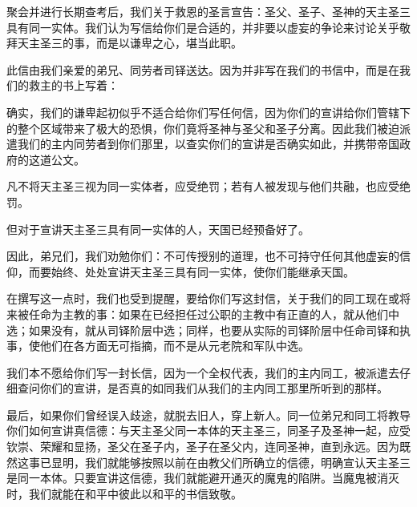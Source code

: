 聚会并进行长期查考后，我们关于救恩的圣言宣告：圣父、圣子、圣神的天主圣三具有同一实体。我们认为写信给你们是合适的，并非要以虚妄的争论来讨论关乎敬拜天主圣三的事，而是以谦卑之心，堪当此职。\par

此信由我们亲爱的弟兄、同劳者司铎送达。因为并非写在我们的书信中，而是在我们的救主的书上写着：\par

确实，我们的谦卑起初似乎不适合给你们写任何信，因为你们的宣讲给你们管辖下的整个区域带来了极大的恐惧，你们竟将圣神与圣父和圣子分离。因此我们被迫派遣我们的主内同劳者到你们那里，以查实你们的宣讲是否确实如此，并携带帝国政府的这道公文。\par

凡不将天主圣三视为同一实体者，应受绝罚；若有人被发现与他们共融，也应受绝罚。\par

但对于宣讲天主圣三具有同一实体的人，天国已经预备好了。\par

因此，弟兄们，我们劝勉你们：不可传授别的道理，也不可持守任何其他虚妄的信仰，而要始终、处处宣讲天主圣三具有同一实体，使你们能继承天国。\par

在撰写这一点时，我们也受到提醒，要给你们写这封信，关于我们的同工现在或将来被任命为主教的事：如果在已经担任过公职的主教中有正直的人，就从他们中选；如果没有，就从司铎阶层中选；同样，也要从实际的司铎阶层中任命司铎和执事，使他们在各方面无可指摘，而不是从元老院和军队中选。\par

我们本不愿给你们写一封长信，因为一个全权代表，我们的主内同工，被派遣去仔细查问你们的宣讲，是否真的如同我们从我们的主内同工那里所听到的那样。\par

最后，如果你们曾经误入歧途，就脱去旧人，穿上新人。同一位弟兄和同工将教导你们如何宣讲真信德：与天主圣父同一本体的天主圣三，同圣子及圣神一起，应受钦崇、荣耀和显扬，圣父在圣子内，圣子在圣父内，连同圣神，直到永远。因为既然这事已显明，我们就能够按照以前在由教父们所确立的信德，明确宣认天主圣三是同一本体。只要宣讲这信德，我们就能避开通灭的魔鬼的陷阱。当魔鬼被消灭时，我们就能在和平中彼此以和平的书信致敬。\par

